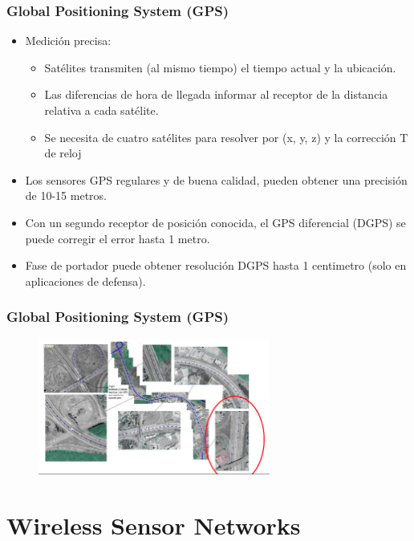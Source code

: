 \documentclass{beamer}
\begin{document}
\begin{frame}
\frametitle{Global Positioning System (GPS)}
\begin{itemize}
\item Medición precisa:
\begin{itemize}
\item Satélites transmiten (al mismo tiempo) el tiempo actual y la ubicación.
\item Las diferencias de hora de llegada informar al receptor de la distancia relativa a cada satélite.
\item Se necesita de cuatro satélites para resolver por (x, y, z) y la corrección T de reloj
\end{itemize}
\item Los sensores GPS regulares y de buena calidad, pueden obtener una precisión de 10-15 metros.
\item Con un segundo receptor de posición conocida, el GPS diferencial (DGPS) se puede corregir el error hasta 1 metro.
\item Fase de portador puede obtener resolución DGPS hasta 1 centimetro (solo en aplicaciones de defensa).
\end{itemize}
\end{frame}

\begin{frame}
\frametitle{Global Positioning System (GPS)}
\begin{figure}[!h]
\centering
\includegraphics[width=3in]{GPS2}
\end{figure}
\end{frame}

\section{Wireless Sensor Networks}
\end{document}

